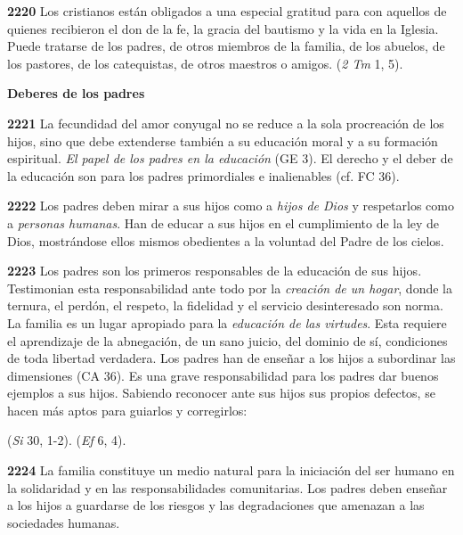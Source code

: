\textbf{2220} Los cristianos están obligados a una especial gratitud para con aquellos de quienes recibieron el don de la fe, la gracia del bautismo y la vida en la Iglesia. Puede tratarse de los padres, de otros miembros de la familia, de los abuelos, de los pastores, de los catequistas, de otros maestros o amigos.  (\emph{2 Tm} 1, 5).

\textbf{Deberes de los padres}

\textbf{2221} La fecundidad del amor conyugal no se reduce a la sola procreación de los hijos, sino que debe extenderse también a su educación moral y a su formación espiritual. \emph{El papel de los padres en la educación}  (GE 3). El derecho y el deber de la educación son para los padres primordiales e inalienables (cf. FC 36).

\textbf{2222} Los padres deben mirar a sus hijos como a \emph{hijos de Dios} y respetarlos como a \emph{personas humanas}. Han de educar a sus hijos en el cumplimiento de la ley de Dios, mostrándose ellos mismos obedientes a la voluntad del Padre de los cielos.

\textbf{2223} Los padres son los primeros responsables de la educación de sus hijos. Testimonian esta responsabilidad ante todo por la \emph{creación de un hogar}, donde la ternura, el perdón, el respeto, la fidelidad y el servicio desinteresado son norma. La familia es un lugar apropiado para la \emph{educación de las virtudes}. Esta requiere el aprendizaje de la abnegación, de un sano juicio, del dominio de sí, condiciones de toda libertad verdadera. Los padres han de enseñar a los hijos a subordinar las dimensiones  (CA 36). Es una grave responsabilidad para los padres dar buenos ejemplos a sus hijos. Sabiendo reconocer ante sus hijos sus propios defectos, se hacen más aptos para guiarlos y corregirlos:

 (\emph{Si} 30, 1-2).  (\emph{Ef} 6, 4).

\textbf{2224} La familia constituye un medio natural para la iniciación del ser humano en la solidaridad y en las responsabilidades comunitarias. Los padres deben enseñar a los hijos a guardarse de los riesgos y las degradaciones que amenazan a las sociedades humanas.


